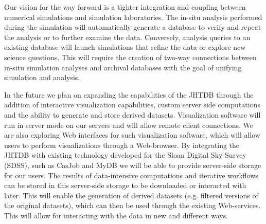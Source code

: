 \documentclass[10pt,twocolumn]{article}
\begin{document}
Our vision for the way forward is a tighter integration and coupling between numerical simulations and simulation laboratories. The in-situ analysis
performed during the simulation will automatically generate a database to verify and repeat the analysis or to further examine the data. Conversely, 
analysis queries to an existing database will launch simulations that refine the data or explore new science questions. This will require the creation of
two-way connections between in-situ simulation analyses and archival databases with the goal of unifying simulation and analysis. 

In the future we plan on expanding the capabilities of the JHTDB through the addition of interactive visualization capabilities, 
custom server side computations and the ability to generate and store derived datasets. Visualization software will run in server
mode on our servers and will allow remote client connections. We are also exploring Web interfaces for such visualization software, which will allow users
to perform visualizations through a Web-browser. By integrating the JHTDB with existing technology developed for the Sloan Digital Sky Survey (SDSS), such
as CasJob and MyDB \cite{LiThakar} we will be able to provide server-side storage for our users. The results of data-intensive computations and iterative 
workflows can be stored in this server-side storage to be downloaded or interacted with later. This will enable the generation of derived datasets (e.g.
filtered versions of the original datasets), which can then be used through the existing Web-services. This will allow for interacting with the data in new
and different ways.

\vfill
\newpage
 

\vfill

\newpage
   
 
\end{document}
